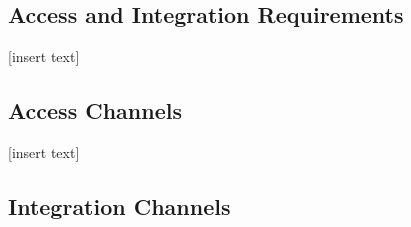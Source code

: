 \documentclass[11pt]{article}
\begin{document}


\tableofcontents	%
\newpage

	\newpage
	\begin{center}
	\section{\textbf{\huge{Access and Integration Requirements}}}
	\end{center}
	
	[insert text]

	\newpage
	\begin{center}
	\section{\textbf{\huge{Access Channels}}}
	\end{center}
	
	[insert text]
		
	\newpage
	\begin{center}
	\section{\textbf{\huge{Integration Channels}}}
	\end{center}
	
\end{document}
